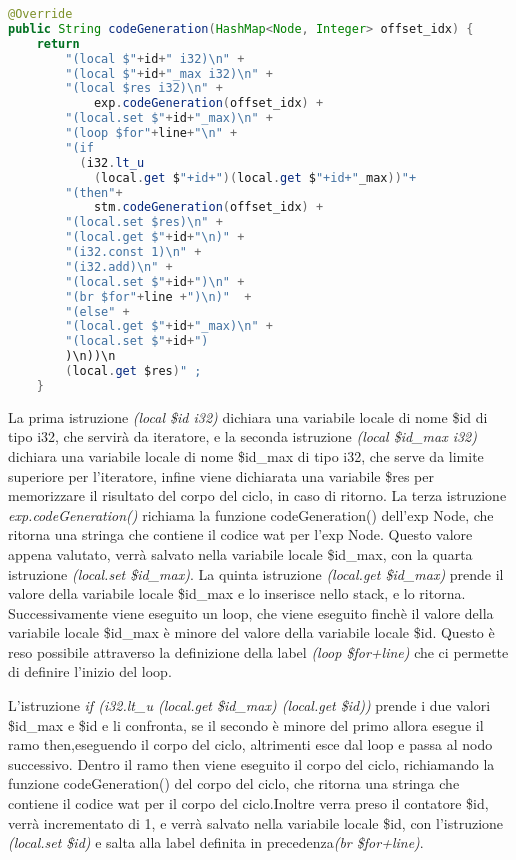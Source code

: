 \documentclass[../../main.tex]{subfiles}
\begin{document}
\begin{lstlisting}[language=Java, caption={codeGeneration() per il for Node}, label={lst:codeGenerationFor}]
@Override
public String codeGeneration(HashMap<Node, Integer> offset_idx) {
    return  
        "(local $"+id+" i32)\n" +
        "(local $"+id+"_max i32)\n" +
        "(local $res i32)\n" +
            exp.codeGeneration(offset_idx) +
        "(local.set $"+id+"_max)\n" +   
        "(loop $for"+line+"\n" +       
        "(if 
          (i32.lt_u 
            (local.get $"+id+")(local.get $"+id+"_max))"+
        "(then"+
            stm.codeGeneration(offset_idx) +
        "(local.set $res)\n" +
        "(local.get $"+id+"\n)" +     
        "(i32.const 1)\n" +
        "(i32.add)\n" +    
        "(local.set $"+id+")\n" +
        "(br $for"+line +")\n)"  +
        "(else" +
        "(local.get $"+id+"_max)\n" + 
        "(local.set $"+id+")
        )\n))\n
        (local.get $res)" ;   
    }

\end{lstlisting}

La prima istruzione \textit{(local \$id i32)} dichiara una variabile locale di nome \$id di tipo i32, che servirà da iteratore, e la seconda istruzione \textit{(local \$id\_max i32)} dichiara una variabile locale di nome \$id\_max di tipo i32, che serve da limite superiore per l'iteratore, infine viene dichiarata una variabile \$res per memorizzare il risultato del corpo del ciclo, in caso di ritorno.
La terza istruzione \textit{exp.codeGeneration()} richiama la funzione codeGeneration() dell'exp Node, che ritorna una stringa che contiene il codice wat per l'exp Node.
Questo valore appena valutato, verrà salvato nella variabile locale \$id\_max, con la quarta istruzione \textit{(local.set \$id\_max)}.
La quinta istruzione \textit{(local.get \$id\_max)} prende il valore della variabile locale \$id\_max e lo inserisce nello stack, e lo ritorna.
Successivamente viene eseguito un loop, che viene eseguito finchè il valore della variabile locale \$id\_max è minore del valore della variabile locale \$id.
Questo è reso possibile attraverso la definizione della label \textit{(loop \$for+line)} che ci permette di definire l'inizio del loop.

L'istruzione \textit{if (i32.lt\_u (local.get \$id\_max) (local.get \$id))} prende i due valori \$id\_max e \$id e li confronta, se il secondo è minore del primo allora esegue il ramo then,eseguendo il corpo del ciclo, altrimenti esce dal loop e passa al nodo successivo.
Dentro il ramo then viene eseguito il corpo del ciclo, richiamando la funzione codeGeneration() del corpo del ciclo, che ritorna una stringa che contiene il codice wat per il corpo del ciclo.Inoltre verra preso il contatore \$id, verrà incrementato di 1, e verrà salvato nella variabile locale \$id, con l'istruzione \textit{(local.set \$id)} e salta alla label definita in precedenza\textit{(br \$for+line)}.
\end{document}
